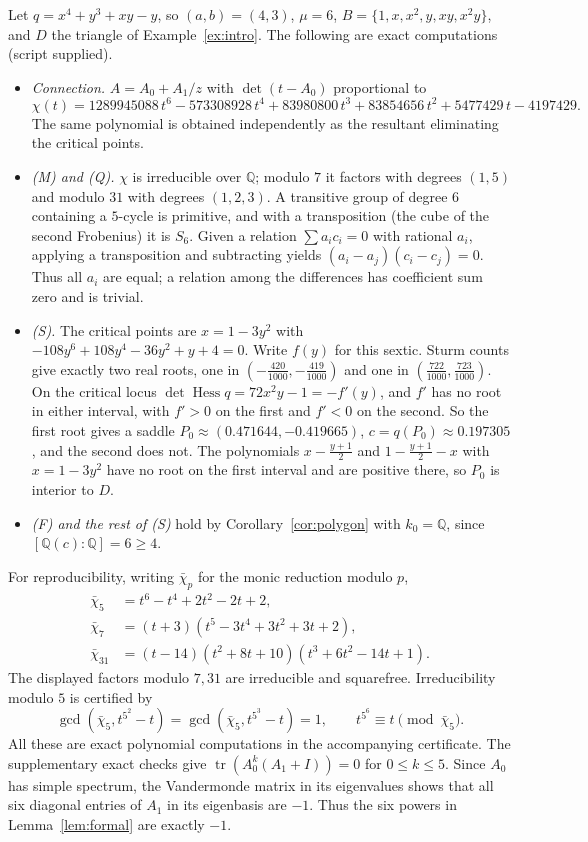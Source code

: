 \documentclass[11pt]{article}
\numberwithin{equation}{section}
\theoremstyle{definition}
\theoremstyle{remark}
\newcommand{\Q}{\mathbb Q}
\begin{document}
Let $q=x^4+y^3+xy-y$, so $(a,b)=(4,3)$, $\mu=6$,
$B=\{1,x,x^2,y,xy,x^2y\}$, and $D$ the triangle of Example~\ref{ex:intro}.
The following are exact computations (script supplied).
\begin{itemize}[leftmargin=1.6em]
\item \emph{Connection.} $A=A_0+A_1/z$ with
 $\det(t-A_0)$ proportional to
 \[
 \chi(t)=1289945088\,t^6-573308928\,t^4+83980800\,t^3+83854656\,t^2+5477429\,t-4197429.
 \]
 The same polynomial is obtained independently as the resultant eliminating
 the critical points.
\item \emph{(M) and (Q).} $\chi$ is irreducible over $\Q$; modulo $7$ it
 factors with degrees $(1,5)$ and modulo $31$ with degrees $(1,2,3)$. A
 transitive group of degree $6$ containing a $5$-cycle is primitive, and with
 a transposition (the cube of the second Frobenius) it is $S_6$. Given a
 relation $\sum a_i c_i=0$ with rational $a_i$, applying a transposition
 and subtracting yields $(a_i-a_j)(c_i-c_j)=0$. Thus all $a_i$ are equal;
 a relation among the differences has coefficient sum zero and is trivial.
\item \emph{(S).} The critical points are $x=1-3y^2$ with
 $-108y^6+108y^4-36y^2+y+4=0$. Write $f(y)$ for this sextic. Sturm counts give exactly two real roots, one in
 $(-\tfrac{420}{1000},-\tfrac{419}{1000})$ and one in
 $(\tfrac{722}{1000},\tfrac{723}{1000})$. On the critical locus
 $\det\operatorname{Hess}q=72x^2y-1=-f'(y)$, and $f'$ has no root in either
 interval, with $f'>0$ on the first and $f'<0$ on the second. So the first root
 gives a saddle $P_0\approx(0.471644,-0.419665)$, $c=q(P_0)\approx0.197305$,
 and the second does not. The polynomials $x-\tfrac{y+1}2$ and
 $1-\tfrac{y+1}2-x$ with $x=1-3y^2$ have no root on the first interval and are
 positive there, so $P_0$ is interior to $D$.
\item \emph{(F) and the rest of (S)} hold by Corollary~\ref{cor:polygon} with
 $k_0=\Q$, since $[\Q(c):\Q]=6\ge4$.
\end{itemize}
For reproducibility, writing $\bar\chi_p$ for the monic reduction modulo $p$,
\begin{align*}
 \bar\chi_5&=t^6-t^4+2t^2-2t+2,\\
 \bar\chi_7&=(t+3)(t^5-3t^4+3t^2+3t+2),\\
 \bar\chi_{31}&=(t-14)(t^2+8t+10)(t^3+6t^2-14t+1).
\end{align*}
The displayed factors modulo $7,31$ are irreducible and squarefree.
Irreducibility modulo $5$ is certified by
\[
 \gcd(\bar\chi_5,t^{5^2}-t)=\gcd(\bar\chi_5,t^{5^3}-t)=1,
 \qquad t^{5^6}\equiv t\pmod{\bar\chi_5}.
\]
All these are exact polynomial computations in the accompanying certificate.
The supplementary exact checks give
$\operatorname{tr}(A_0^k(A_1+I))=0$ for $0\le k\le5$.
Since $A_0$ has simple spectrum, the Vandermonde matrix in its eigenvalues
shows that all six diagonal entries of $A_1$ in its eigenbasis are $-1$.
Thus the six powers in Lemma~\ref{lem:formal} are exactly $-1$.
\end{document}
